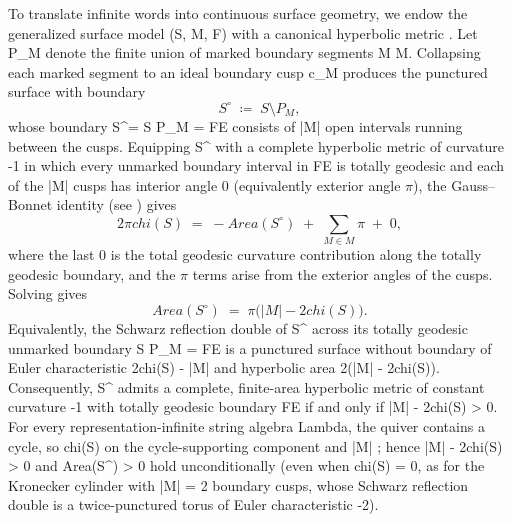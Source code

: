 \documentclass[11pt,a4paper,reqno]{amsart}
\def\({}%
\def\){}%
\def\mathcal#1{#1}%
\def\operatorname#1{#1}%
\def\forb{F}%
\def\chi{chi}%
\def\Lambda{Lambda}%
\theoremstyle{definition}
\theoremstyle{remark}
\newcommand{\forb}{\mathfrak{F}}
\begin{document}
To translate infinite words into continuous surface geometry, we endow the generalized surface model \((\mathcal{S}, \mathcal{M}, \forb)\) with a canonical hyperbolic metric \cite{Thurston1988, CassonBleiler1988}. Let \(\mathcal{P}_{\mathcal{M}}\) denote the finite union of marked boundary segments \(M \in \mathcal{M}\). Collapsing each marked segment to an ideal boundary cusp \(c_M\) produces the punctured surface with boundary
\[
\mathcal{S}^\circ \;\coloneqq\; \mathcal{S} \setminus \mathcal{P}_{\mathcal{M}},
\]
whose boundary \(\partial\mathcal{S}^\circ = \partial\mathcal{S} \setminus \mathcal{P}_{\mathcal{M}} = \forb \cup \mathcal{E}\) consists of \(|\mathcal{M}|\) open intervals running between the cusps. Equipping \(\mathcal{S}^\circ\) with a complete hyperbolic metric of curvature \(-1\) in which every unmarked boundary interval in \(\forb \cup \mathcal{E}\) is totally geodesic and each of the \(|\mathcal{M}|\) cusps has interior angle \(0\) (equivalently exterior angle $\pi$), the Gauss--Bonnet identity (see \cite[Chapter~1]{CassonBleiler1988}) gives
\[
2\pi\chi(\mathcal{S}) \;=\; -\operatorname{Area}(\mathcal{S}^\circ) \;+\; \sum_{M \in \mathcal{M}}\pi \;+\; 0,
\]
where the last $0$ is the total geodesic curvature contribution along the totally geodesic boundary, and the $\pi$ terms arise from the exterior angles of the cusps. Solving gives
\[
\operatorname{Area}(\mathcal{S}^\circ) \;=\; \pi\bigl(|\mathcal{M}| - 2\chi(\mathcal{S})\bigr).
\]
Equivalently, the Schwarz reflection double of \(\mathcal{S}^\circ\) across its totally geodesic unmarked boundary \(\partial\mathcal{S} \setminus \mathcal{P}_{\mathcal{M}} = \forb \cup \mathcal{E}\) is a punctured surface without boundary of Euler characteristic \(2\chi(\mathcal{S}) - |\mathcal{M}|\) and hyperbolic area \(2\pi(|\mathcal{M}| - 2\chi(\mathcal{S}))\). Consequently, \(\mathcal{S}^\circ\) admits a complete, finite-area hyperbolic metric of constant curvature \(-1\) with totally geodesic boundary \(\forb \cup \mathcal{E}\) if and only if \(|\mathcal{M}| - 2\chi(\mathcal{S}) > 0\). For every representation-infinite string algebra \(\Lambda\), the quiver contains a cycle, so \(\chi(\mathcal{S}) \) on the cycle-supporting component and \(|\mathcal{M}| \); hence \(|\mathcal{M}| - 2\chi(\mathcal{S})  > 0\) and \(\operatorname{Area}(\mathcal{S}^\circ) \pi > 0\) hold unconditionally (even when \(\chi(\mathcal{S}) = 0\), as for the Kronecker cylinder with \(|\mathcal{M}| = 2\) boundary cusps, whose Schwarz reflection double is a twice-punctured torus of Euler characteristic \(-2\)).
\end{document}

